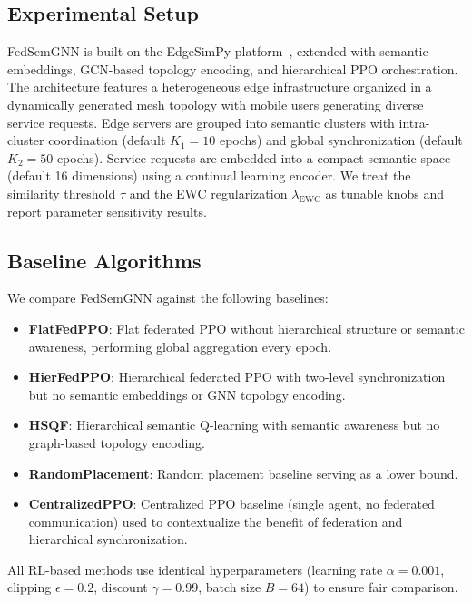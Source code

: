 \documentclass[conference]{IEEEtran}
\begin{document}
	\subsection{Experimental Setup}
	\textcolor{revblue}{FedSemGNN is built on the EdgeSimPy platform~\cite{souza2023edgesimpy}, extended with semantic embeddings, GCN-based topology encoding, and hierarchical PPO orchestration. The architecture features a heterogeneous edge infrastructure organized in a dynamically generated mesh topology with mobile users generating diverse service requests. Edge servers are grouped into semantic clusters with intra-cluster coordination (default $K_1=10$ epochs) and global synchronization (default $K_2=50$ epochs). Service requests are embedded into a compact semantic space (default 16 dimensions) using a continual learning encoder. We treat the similarity threshold $\tau$ and the EWC regularization $\lambda_{\mathrm{EWC}}$ as tunable knobs and report parameter sensitivity results.}
	
	\subsection{Baseline Algorithms}
	We compare FedSemGNN against the following baselines:
	
	\begin{itemize}
		\item \textbf{FlatFedPPO}: Flat federated PPO without hierarchical structure or semantic awareness, performing global aggregation every epoch.
		\item \textbf{HierFedPPO}: Hierarchical federated PPO with two-level synchronization but no semantic embeddings or GNN topology encoding.
		\item \textbf{HSQF}: Hierarchical semantic Q-learning with semantic awareness but no graph-based topology encoding.
		\item \textbf{RandomPlacement}: Random placement baseline serving as a lower bound.
		\item \textbf{CentralizedPPO}: Centralized PPO baseline (single agent, no federated communication) used to contextualize the benefit of federation and hierarchical synchronization.
	\end{itemize}
	
	All RL-based methods use identical hyperparameters (learning rate $\alpha = 0.001$, clipping $\epsilon = 0.2$, discount $\gamma = 0.99$, batch size $B = 64$) to ensure fair comparison.
	
\end{document}
